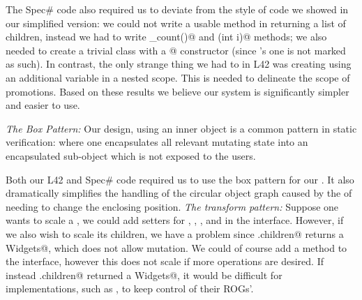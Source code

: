 




The Spec\# code also required us to deviate from the style of code we showed in our simplified version: we could not write a usable \Q@children@ method in \Q@Widget@ returning a list of children, instead we had to write \Q@children_count()@ and \Q@children(int i)@ methods; we also needed to create a trivial class with a \Q@[Pure]@ constructor (since \Q@Object@'s one is not marked as such). In contrast, the only strange thing we had to in L42 was creating \Q@Box@es using 
an additional variable in a nested scope.
This is needed to delineate the scope of promotions.
Based on these results we believe our system is significantly simpler and easier to use.

\textit{The Box Pattern:}
Our design, using an inner \Q@Box@ object is a common pattern in static verification: where one encapsulates all relevant mutating state into an encapsulated sub-object which is not exposed to the users.

Both our L42 and Spec\# code required us to use the box pattern for our \Q@SafeMovable@. It also dramatically simplifies the handling of the circular object graph caused by the \Q@Action@s of \Q@Button@s needing to change the enclosing \Q@SafeMovable@s position.
\textit{The transform pattern:}
Suppose one wants to scale a \Q@Widget@, we could add \Q@mut@ setters for \Q@width@, \Q@height@, \Q@left@, and \Q@top@ in the \Q@Widget@ interface. However, if we also wish to scale its children, we have a problem since \Q@Widget.children@ returns a \Q@read Widgets@, which does not allow mutation. We could of course add a \Q@mut@ method \Q@zoom@ to the \Q@Widget@ interface, however this does not scale if more operations are desired. If instead \Q@Widget.children@ returned a \Q@mut Widgets@, it would be difficult for \Q@Widget@ implementations, such as \Q@SafeMovable@, to keep control of their ROGs'.

